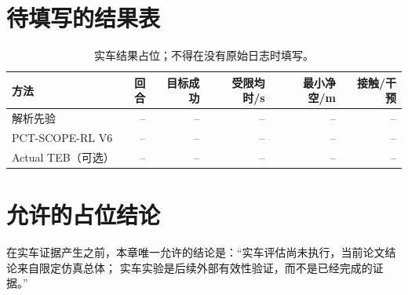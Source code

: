 \section{待填写的结果表}
\begin{table}[htbp]
\centering
\caption{实车结果占位；不得在没有原始日志时填写。}
\begin{tabular}{lrrrrr}
\toprule
方法 & 回合 & 目标成功 & 受限均时/s & 最小净空/m & 接触/干预\\
\midrule
解析先验 & -- & -- & -- & -- & --\\
PCT-SCOPE-RL V6 & -- & -- & -- & -- & --\\
Actual TEB（可选） & -- & -- & -- & -- & --\\
\bottomrule
\end{tabular}
\end{table}

\section{允许的占位结论}
在实车证据产生之前，本章唯一允许的结论是：“实车评估尚未执行，当前论文结论来自限定仿真总体；
实车实验是后续外部有效性验证，而不是已经完成的证据。”

